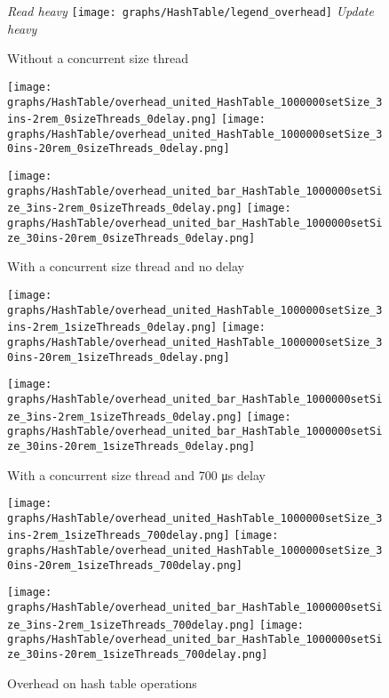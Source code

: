 \documentclass{article}
\begin{document}
\begin{figure*}[htbp]
	\centering
	\medskip
	\textit{Read heavy}\quad\quad
	\texttt{[image: graphs/HashTable/legend\_overhead]}\quad\quad
	\textit{Update heavy}\par
	\medskip
	Without a concurrent size thread\par
        \smallskip
	\texttt{[image: graphs/HashTable/overhead\_united\_HashTable\_1000000setSize\_3ins-2rem\_0sizeThreads\_0delay.png]}\hspace{2.5em}
	\texttt{[image: graphs/HashTable/overhead\_united\_HashTable\_1000000setSize\_30ins-20rem\_0sizeThreads\_0delay.png]}\par
	\texttt{[image: graphs/HashTable/overhead\_united\_bar\_HashTable\_1000000setSize\_3ins-2rem\_0sizeThreads\_0delay.png]}\hspace{2.5em}
	\texttt{[image: graphs/HashTable/overhead\_united\_bar\_HashTable\_1000000setSize\_30ins-20rem\_0sizeThreads\_0delay.png]}\par
	\medskip
	With a concurrent size thread and no delay\par
	\texttt{[image: graphs/HashTable/overhead\_united\_HashTable\_1000000setSize\_3ins-2rem\_1sizeThreads\_0delay.png]}\hspace{2.5em}
	\texttt{[image: graphs/HashTable/overhead\_united\_HashTable\_1000000setSize\_30ins-20rem\_1sizeThreads\_0delay.png]}\par
	\texttt{[image: graphs/HashTable/overhead\_united\_bar\_HashTable\_1000000setSize\_3ins-2rem\_1sizeThreads\_0delay.png]}\hspace{2.5em}
	\texttt{[image: graphs/HashTable/overhead\_united\_bar\_HashTable\_1000000setSize\_30ins-20rem\_1sizeThreads\_0delay.png]}\par
	\medskip
	With a concurrent size thread and 700 \si{\micro\second} delay\par
	\texttt{[image: graphs/HashTable/overhead\_united\_HashTable\_1000000setSize\_3ins-2rem\_1sizeThreads\_700delay.png]}\hspace{2.5em}
	\texttt{[image: graphs/HashTable/overhead\_united\_HashTable\_1000000setSize\_30ins-20rem\_1sizeThreads\_700delay.png]}\par
	\texttt{[image: graphs/HashTable/overhead\_united\_bar\_HashTable\_1000000setSize\_3ins-2rem\_1sizeThreads\_700delay.png]}\hspace{2.5em}
	\texttt{[image: graphs/HashTable/overhead\_united\_bar\_HashTable\_1000000setSize\_30ins-20rem\_1sizeThreads\_700delay.png]}\par
	\caption{Overhead on hash table operations}
	\label{fig:HT overhead}
\end{figure*}
\end{document}
